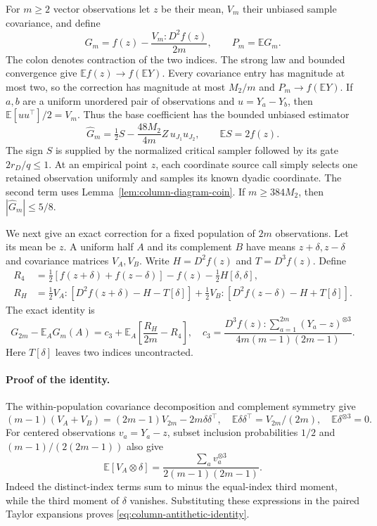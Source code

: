 For $m\ge2$ vector observations let $z$ be their mean, $V_m$ their
unbiased sample covariance, and define
\[
 G_m=f(z)-\frac{V_m:D^2f(z)}{2m},\qquad P_m=\mathbb E G_m.
\]
The colon denotes contraction of the two indices.  The strong law
and bounded convergence give $\mathbb E f(z)\to f(\mathbb E Y)$.
Every covariance entry has magnitude at most two, so the correction
has magnitude at most $M_2/m$ and $P_m\to f(\mathbb E Y)$.
If $a,b$ are a uniform unordered
pair of observations and $u=Y_a-Y_b$, then
$\mathbb E[uu^\top]/2=V_m$.  Thus the base coefficient has the bounded
unbiased estimator
\[
 \widehat G_m=\tfrac12 S-\frac{48M_2}{4m}
                         Z\,u_{J_1}u_{J_2},
 \qquad \mathbb E S=2f(z).
\]
The sign $S$ is supplied by the normalized critical sampler followed
by its gate $2r_D/q\le1$.  At an empirical point $z$, each coordinate
source call simply selects one retained observation uniformly and
samples its known dyadic coordinate.  The second term uses
Lemma~\ref{lem:column-diagram-coin}.  If $m\ge384M_2$, then
$|\widehat G_m|\le5/8$.

We next give an exact correction for a fixed population of $2m$
observations.  Let its mean be $z$.  A uniform half $A$ and its
complement $B$ have means $z+\delta,z-\delta$ and covariance matrices
$V_A,V_B$.  Write $H=D^2f(z)$ and $T=D^3f(z)$.  Define
\begin{align*}
 R_4&=\tfrac12[f(z+\delta)+f(z-\delta)]-f(z)
                          -\tfrac12H[\delta,\delta],\\
 R_H&=\tfrac12V_A:[D^2f(z+\delta)-H-T[\delta]]
       +\tfrac12V_B:[D^2f(z-\delta)-H+T[\delta]].
\end{align*}
The exact identity is
\begin{equation}
 G_{2m}-\mathbb E_A G_m(A)
 =c_3+\mathbb E_A\left[\frac{R_H}{2m}-R_4\right],
 \quad
 c_3=\frac{D^3f(z):\sum_{a=1}^{2m}(Y_a-z)^{\otimes3}}
                  {4m(m-1)(2m-1)}.
 \label{eq:column-antithetic-identity}
\end{equation}
Here $T[\delta]$ leaves two indices uncontracted.

\paragraph{Proof of the identity.}
The within-population covariance decomposition and complement symmetry
give
\[
 (m-1)(V_A+V_B)=(2m-1)V_{2m}-2m\delta\delta^\top,
 \quad \mathbb E\delta\delta^\top=V_{2m}/(2m),
 \quad \mathbb E\delta^{\otimes3}=0.
\]
For centered observations $v_a=Y_a-z$, subset inclusion probabilities
$1/2$ and $(m-1)/(2(2m-1))$ also give
\[
 \mathbb E[V_A\otimes\delta]
 =\frac{\sum_av_a^{\otimes3}}{2(m-1)(2m-1)}.
\]
Indeed the distinct-index terms sum to minus the equal-index third
moment, while the third moment of $\delta$ vanishes.  Substituting
these expressions in the paired Taylor expansions proves
\eqref{eq:column-antithetic-identity}.

